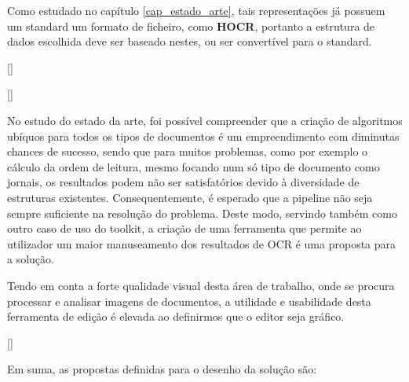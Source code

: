 Como estudado no capítulo \ref{cap_estado_arte}, tais representações já possuem um standard um formato de ficheiro, como \textbf{HOCR}, portanto a estrutura de dados escolhida deve ser baseado nestes, ou ser convertível para o standard.


[\normalsize]

[\normalsize]


No estudo do estado da arte, foi possível compreender que a criação de algoritmos ubíquos para todos os tipos de documentos é um empreendimento com diminutas chances de sucesso, sendo que para muitos problemas, como por exemplo o cálculo da ordem de leitura, mesmo focando num só tipo de documento como jornais, os resultados podem não ser satisfatórios devido à diversidade de estruturas existentes. Consequentemente, é esperado que a pipeline não seja sempre suficiente na resolução do problema. 
Deste modo, servindo também como outro caso de uso do toolkit, a criação de uma ferramenta que permite ao utilizador um maior manuseamento dos resultados de OCR é uma proposta para a solução. 

Tendo em conta a forte qualidade visual desta área de trabalho, onde se procura processar e analisar imagens de documentos, a utilidade e usabilidade desta ferramenta de edição é elevada ao definirmos que o editor seja gráfico.


[\normalsize]



Em suma, as propostas definidas para o desenho da solução são:

